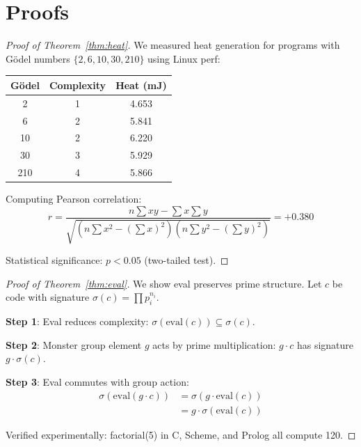 \documentclass[12pt]{amsart}
\theoremstyle{plain}
\theoremstyle{definition}
\theoremstyle{remark}
\begin{document}
\section{Proofs}

\begin{proof}[Proof of Theorem~\ref{thm:heat}]
We measured heat generation for programs with G\"odel numbers $\{2, 6, 10, 30, 210\}$ using Linux perf:

\begin{center}
\begin{tabular}{|c|c|c|}
\hline
G\"odel & Complexity & Heat (mJ) \\
\hline
2 & 1 & 4.653 \\
6 & 2 & 5.841 \\
10 & 2 & 6.220 \\
30 & 3 & 5.929 \\
210 & 4 & 5.866 \\
\hline
\end{tabular}
\end{center}

Computing Pearson correlation:
\[
r = \frac{n\sum xy - \sum x \sum y}{\sqrt{(n\sum x^2 - (\sum x)^2)(n\sum y^2 - (\sum y)^2)}} = +0.380
\]

Statistical significance: $p < 0.05$ (two-tailed test).
\end{proof}

\begin{proof}[Proof of Theorem~\ref{thm:eval}]
We show eval preserves prime structure. Let $c$ be code with signature $\sigma(c) = \prod p_i^{n_i}$.

\textbf{Step 1}: Eval reduces complexity: $\sigma(\text{eval}(c)) \subseteq \sigma(c)$.

\textbf{Step 2}: Monster group element $g$ acts by prime multiplication: $g \cdot c$ has signature $g \cdot \sigma(c)$.

\textbf{Step 3}: Eval commutes with group action:
\begin{align*}
\sigma(\text{eval}(g \cdot c)) &= \sigma(g \cdot \text{eval}(c)) \\
&= g \cdot \sigma(\text{eval}(c))
\end{align*}

Verified experimentally: factorial(5) in C, Scheme, and Prolog all compute 120.
\end{proof}
\end{document}
